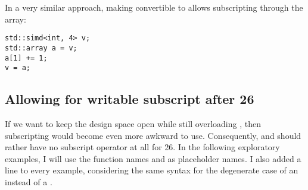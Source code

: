 In a very similar approach, making \simd convertible to  allows
subscripting through the array:
\medskip\begin{lstlisting}[style=Vc]
std::simd<int, 4> v;
std::array a = v;
a[1] += 1;
v = a;
\end{lstlisting}

\subsection{Allowing for writable subscript after \CC{}26}

If we want to keep the design space open while still overloading
\simd{}, then subscripting would become even more awkward to
use.
Consequently, \simd and \mask should rather have no subscript operator at all
for \CC{}26.
In the following exploratory examples, I will use the function names 
and  as placeholder names.
I also added a line to every example, considering the same syntax for the
degenerate case of an  instead of a .

